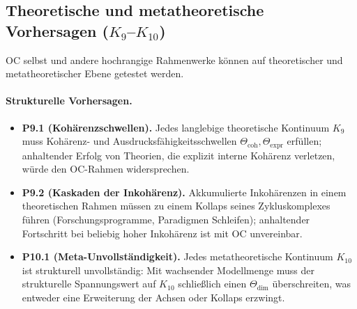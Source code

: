 {%
\subsection{Theoretische und metatheoretische Vorhersagen
            (\texorpdfstring{$K_9$}{K\_9}--\texorpdfstring{$K_{10}$}{K\_{10}})}

OC selbst und andere hochrangige Rahmenwerke können auf theoretischer und
metatheoretischer Ebene getestet werden.

\paragraph{Strukturelle Vorhersagen.}
\begin{itemize}
  \item \textbf{P9.1 (Kohärenzschwellen).}
        Jedes langlebige theoretische Kontinuum \(K_9\) muss Kohärenz- und
        Ausdrucksfähigkeitsschwellen \(\Theta_{\mathrm{coh}}, \Theta_{\mathrm{expr}}\)
erfüllen; anhaltender Erfolg von Theorien, die explizit interne Kohärenz verletzen,
        würde den OC-Rahmen widersprechen.
  \item \textbf{P9.2 (Kaskaden der Inkohärenz).}
        Akkumulierte Inkohärenzen in einem theoretischen Rahmen müssen zu einem
        Kollaps seines Zykluskomplexes führen (Forschungsprogramme, Paradigmen
        Schleifen); anhaltender Fortschritt bei beliebig hoher Inkohärenz ist
        mit OC unvereinbar.
  \item \textbf{P10.1 (Meta-Unvollständigkeit).}
        Jedes metatheoretische Kontinuum \(K_{10}\) ist strukturell unvollständig:
        Mit wachsender Modellmenge muss der strukturelle Spannungswert auf
        \(K_{10}\) schließlich einen \(\Theta_{\mathrm{dim}}\) überschreiten,
        was entweder eine Erweiterung der Achsen oder Kollaps erzwingt.
\end{itemize}

}
